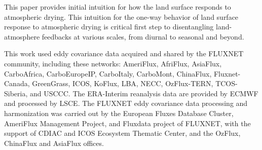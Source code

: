 \documentclass[draft,linenumbers]{agujournal}
\begin{document}
This paper provides initial intuition for how the land surface responds to atmospheric drying. This intuition for the one-way behavior of  land surface response to atmospheric drying is critical first step to disentangling land-atmosphere feedbacks at various scales, from diurnal to seasonal and beyond. 


\acknowledgments
This work used eddy covariance data acquired and shared by the FLUXNET community, including these networks: AmeriFlux, AfriFlux, AsiaFlux, CarboAfrica, CarboEuropeIP, CarboItaly, CarboMont, ChinaFlux, Fluxnet-Canada, GreenGrass, ICOS, KoFlux, LBA, NECC, OzFlux-TERN, TCOS-Siberia, and USCCC. The ERA-Interim reanalysis data are provided by ECMWF and processed by LSCE. The FLUXNET eddy covariance data processing and harmonization was carried out by the European Fluxes Database Cluster, AmeriFlux Management Project, and Fluxdata project of FLUXNET, with the support of CDIAC and ICOS Ecosystem Thematic Center, and the OzFlux, ChinaFlux and AsiaFlux offices.

%


\listofchanges
\end{document}
